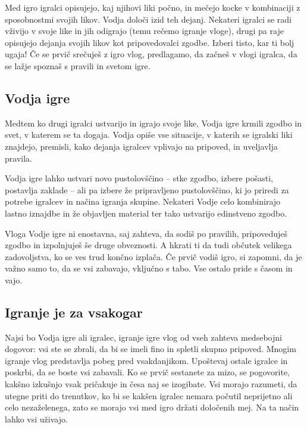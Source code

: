 Med igro igralci opisujejo, kaj njihovi liki počno, in mečejo kocke v kombinaciji z sposobnostmi svojih likov. Vodja določi izid teh dejanj. Nekateri igralci se radi vživijo v svoje like in jih odigrajo (temu rečemo igranje vloge), drugi pa raje opisujejo dejanja svojih likov kot pripovedovalci zgodbe. Izberi tisto, kar ti bolj ugaja! Če se prvič srečuješ z igro vlog, predlagamo, da začneš v vlogi igralca, da se lažje spoznaš s pravili in svetom igre.

\subsection{Vodja igre}

Medtem ko drugi igralci ustvarijo in igrajo svoje like, Vodja igre krmili zgodbo in svet, v katerem se ta dogaja. Vodja opiše vse situacije, v katerih se igralski liki znajdejo, premisli, kako dejanja igralcev vplivajo na pripoved, in uveljavlja pravila.

Vodja igre lahko ustvari novo pustolovščino -- stke zgodbo, izbere pošasti, postavlja zaklade -- ali pa izbere že pripravljeno pustolovščino, ki jo priredi za potrebe igralcev in načina igranja skupine. Nekateri Vodje celo kombinirajo lastno iznajdbe in že objavljen material ter tako ustvarijo edinstveno zgodbo.

Vloga Vodje igre ni enostavna, saj zahteva, da sodiš po pravilih, pripoveduješ zgodbo in izpolnjuješ še druge obveznosti. A hkrati ti da tudi občutek velikega zadovoljstva, ko se ves trud končno izplača. Če prvič vodiš igro, si zapomni, da je važno samo to, da se vsi zabavajo, vključno s tabo. Vse ostalo pride s časom in vajo.

\subsection{Igranje je za vsakogar}

Najsi bo Vodja igre ali igralec, igranje igre vlog od vseh zahteva medsebojni dogovor: vsi ste se zbrali, da bi se imeli fino in spletli skupno pripoved. Mnogim igranje vlog predstavlja pobeg pred vsakdanjikom. Upoštevaj ostale igralce in poskrbi, da se boste vsi zabavali. Ko se prvič sestanete za mizo, se pogovorite, kakšno izkušnjo vsak pričakuje in česa naj se izogibate. Vsi morajo razumeti, da utegne priti do trenutkov, ko bi se kakšen igralec nemara počutil neprijetno ali celo nezaželenega, zato se morajo vsi med igro držati določenih mej. Na ta način lahko vsi uživajo.

